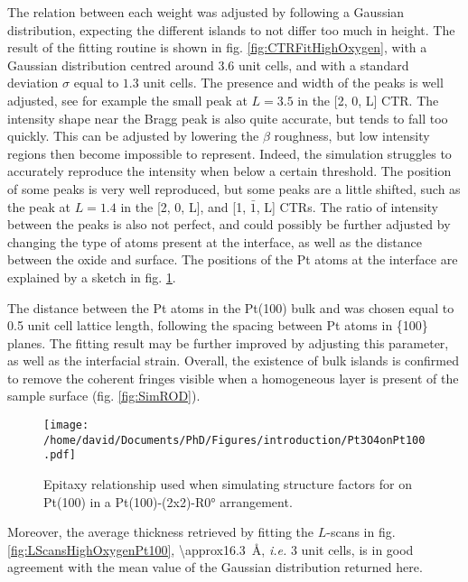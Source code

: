 The relation between each weight was adjusted by following a Gaussian distribution, expecting the different islands to not differ too much in height.
The result of the fitting routine is shown in fig. \ref{fig:CTRFitHighOxygen}, with a Gaussian distribution centred around $3.6$ unit cells, and with a standard deviation $\sigma$ equal to $1.3$ unit cells.
The presence and width of the  peaks is well adjusted, see for example the small peak at $L=3.5$ in the [2, 0, L] CTR.
The intensity shape near the Bragg peak is also quite accurate, but tends to fall too quickly.
This can be adjusted by lowering the $\beta$ roughness, but low intensity regions then become impossible to represent.
Indeed, the simulation struggles to accurately reproduce the intensity when below a certain threshold.
The position of some peaks is very well reproduced, but some peaks are a little shifted, such as the peak at $L=1.4$ in the [2, 0, L], and [1, $\bar{1}$, L] CTRs.
The ratio of intensity between the  peaks is also not perfect, and could possibly be further adjusted by changing the type of atoms present at the interface, as well as the distance between the oxide and surface.
The positions of the Pt atoms at the interface are explained by a sketch in fig. \ref{fig:Pt3O4onPt100}.

The distance between the Pt atoms in the Pt(100) bulk and  was chosen equal to \num{0.5} unit cell lattice length, following the spacing between Pt atoms in \{100\} planes.
The fitting result may be further improved by adjusting this parameter, as well as the interfacial strain.
Overall, the existence of bulk  islands is confirmed to remove the coherent fringes visible when a homogeneous layer is present of the sample surface (fig. \ref{fig:SimROD}).

\begin{figure}[!htb]
    \centering
    \texttt{[image: /home/david/Documents/PhD/Figures/introduction/Pt3O4onPt100.pdf]}
    \caption{
    Epitaxy relationship used when simulating structure factors for  on Pt(100) in a Pt(100)-(2x2)-R\ang{0} arrangement.
    }
    \label{fig:Pt3O4onPt100}
\end{figure}

Moreover, the average thickness retrieved by fitting the $L$-scans in fig. \ref{fig:LScansHighOxygenPt100}, \qty{\approx16.3}{\angstrom}, \textit{i.e.} 3 unit cells, is in good agreement with the mean value of the Gaussian distribution returned here.

